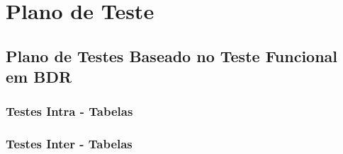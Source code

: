\chapter{Plano de Teste}
\label{planoTeste}



\section{Plano de Testes Baseado no Teste Funcional em BDR}
\label{planoTestesBDR}

\subsection{Testes Intra - Tabelas}
\label{testesIntraTabela}

\subsection{Testes Inter - Tabelas}
\label{testesInterTabela}